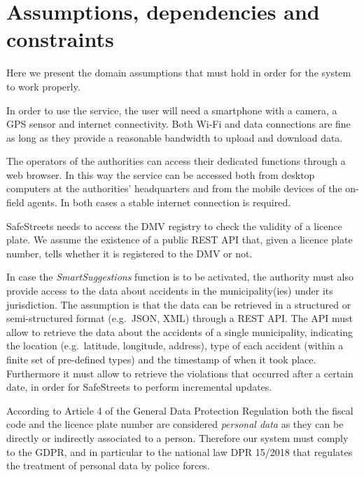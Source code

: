 \section{Assumptions, dependencies and constraints}
\label{sec:ass_deps_constr}

Here we present the domain assumptions that must hold in order for the system
to work properly.
\begin{description}
\end{description}

In order to use the service, the user will need a smartphone with a camera,
a GPS sensor and internet connectivity. Both Wi-Fi and data connections are fine
as long as they provide a reasonable bandwidth to upload and download data.

The operators of the authorities can access their dedicated functions through
a web browser. In this way the service can be accessed both from desktop
computers at the authorities' headquarters and from the mobile devices of the
on-field agents. In both cases a stable internet connection is required.

SafeStreets needs to access the DMV registry to check the validity of a licence
plate.
We assume the existence of a public REST API that, given a licence plate number,
tells whether it is registered to the DMV or not.

In case the \emph{SmartSuggestions} function is to be activated, the authority
must also provide access to the data about accidents in the municipality(ies)
under its jurisdiction.
The assumption is that the data can be retrieved in a structured or
semi-structured format (e.g.\ JSON, XML) through a REST API.
The API must allow to retrieve the data about the accidents of a single
municipality, indicating the location (e.g.\ latitude, longitude, address),
type of each accident (within a finite set of pre-defined types) and the
timestamp of when it took place.
Furthermore it must allow to retrieve the violations that occurred after a
certain date, in order for SafeStreets to perform incremental updates.

According to Article 4 of the General Data Protection Regulation
\cite{gdpr:article-4-definitions} both the fiscal code and the licence plate
number are considered \emph{personal data} as they can be directly or indirectly
associated to a person. Therefore our system must comply to the GDPR, and in
particular to the national law DPR 15/2018 \cite{gu:dpr-15/2018} that regulates
the treatment of personal data by police forces.
